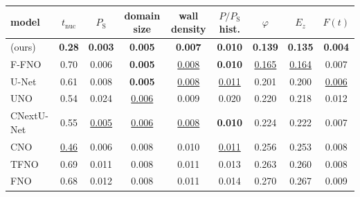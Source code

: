 \begin{tabular}{lcccccccc}
\toprule
model & $t_{\mathrm{nuc}}$ & $P_{\mathrm{S}}$ & domain size & wall density & $P/P_{\mathrm{S}}$ hist. & $\varphi$ & $E_z$ & $F(t)$ \\
\midrule
\DU{} (ours) & \textbf{0.28} & \textbf{0.003} & \textbf{0.005} & \textbf{0.007} & \textbf{0.010} & \textbf{0.139} & \textbf{0.135} & \textbf{0.004} \\
\midrule
F-FNO & 0.70 & 0.006 & \textbf{0.005} & \underline{0.008} & \textbf{0.010} & \underline{0.165} & \underline{0.164} & 0.007 \\
U-Net & 0.61 & 0.008 & \textbf{0.005} & \underline{0.008} & \underline{0.011} & 0.201 & 0.200 & \underline{0.006} \\
UNO & 0.54 & 0.024 & \underline{0.006} & 0.009 & 0.020 & 0.220 & 0.218 & 0.012 \\
CNextU-Net & 0.55 & \underline{0.005} & \underline{0.006} & \underline{0.008} & \textbf{0.010} & 0.224 & 0.222 & 0.007 \\
CNO & \underline{0.46} & 0.006 & 0.008 & 0.010 & \underline{0.011} & 0.256 & 0.253 & 0.008 \\
TFNO & 0.69 & 0.011 & 0.008 & 0.011 & 0.013 & 0.263 & 0.260 & 0.008 \\
FNO & 0.68 & 0.012 & 0.008 & 0.011 & 0.014 & 0.270 & 0.267 & 0.009 \\
\bottomrule
\end{tabular}
